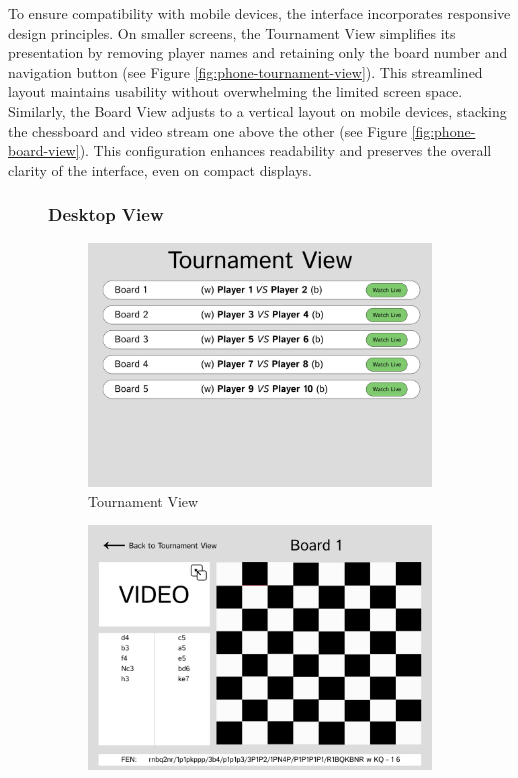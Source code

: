 To ensure compatibility with mobile devices, the interface incorporates responsive design principles. On smaller screens, the Tournament View simplifies its presentation by removing player names and retaining only the board number and navigation button (see Figure \ref{fig:phone-tournament-view}). This streamlined layout maintains usability without overwhelming the limited screen space.
Similarly, the Board View adjusts to a vertical layout on mobile devices, stacking the chessboard and video stream one above the other (see Figure \ref{fig:phone-board-view}). This configuration enhances readability and preserves the overall clarity of the interface, even on compact displays.


\begin{figure}[h!]
\subsubsection*{Desktop View}
    \centering
    \begin{subfigure}[h!]{0.40\linewidth}
        \centering
        \includegraphics[width=\linewidth]{figures/methods/wireframes/desktop-tournament-view.png}
        \caption{Tournament View}
        \label{fig:desktop-tournament-view}
    \end{subfigure}
    \hfill
    \begin{subfigure}[h!]{0.40\linewidth}
        \centering
        \includegraphics[width=\linewidth]{figures/methods/wireframes/desktop-board-view.png}

\end{subfigure}
\end{figure}
